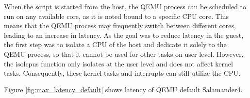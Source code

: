 \documentclass[MMR,Master,english]{twbook}
\begin{document}
%   

\noindent When the script is started from the host, the QEMU process can be scheduled to run on any available core, as it is noted bound to a specific CPU core. This means that the QEMU process may frequently switch between different cores, leading to an increase in latency. As the goal was to reduce latency in the guest, the first step was to isolate a CPU of the host and dedicate it solely to the QEMU process, so that it cannot be used for other tasks on user level. However, the isolcpus function only isolates at the user level and does not affect kernel tasks. Consequently, these kernel tasks and interrupts can still utilize the CPU.


Figure \ref{fig:max_latency_default} shows latency of QEMU default Salamander4.
\end{document}
